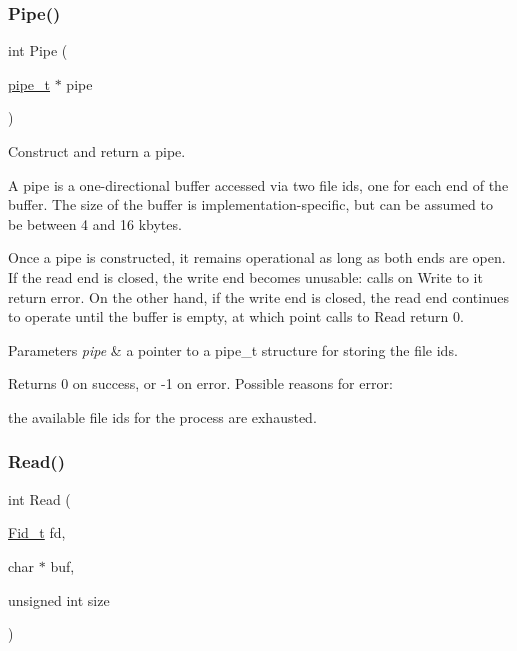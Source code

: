 \subsubsection{\texorpdfstring{Pipe()}{Pipe()}}
{\footnotesize\ttfamily int Pipe (\begin{DoxyParamCaption}\item[{\hyperlink{group__syscalls_gad56b5ceaaf7d3ab88b4be7f622314dfb}{pipe\+\_\+t} $\ast$}]{pipe }\end{DoxyParamCaption})}



Construct and return a pipe. 

A pipe is a one-\/directional buffer accessed via two file ids, one for each end of the buffer. The size of the buffer is implementation-\/specific, but can be assumed to be between 4 and 16 kbytes.

Once a pipe is constructed, it remains operational as long as both ends are open. If the read end is closed, the write end becomes unusable\+: calls on {\ttfamily Write} to it return error. On the other hand, if the write end is closed, the read end continues to operate until the buffer is empty, at which point calls to {\ttfamily Read} return 0.


\begin{DoxyParams}{Parameters}
{\em pipe} & a pointer to a pipe\+\_\+t structure for storing the file ids. \\
\hline
\end{DoxyParams}
\begin{DoxyReturn}{Returns}
0 on success, or -\/1 on error. Possible reasons for error\+:
\begin{DoxyItemize}
\item the available file ids for the process are exhausted. 
\end{DoxyItemize}
\end{DoxyReturn}
\mbox{\label{group__syscalls_ga3e9dc545a789eb45b2d356eabbac3ee3}} 
\subsubsection{\texorpdfstring{Read()}{Read()}}
{\footnotesize\ttfamily int Read (\begin{DoxyParamCaption}\item[{\hyperlink{group__syscalls_ga5097222c5f0da97d92d4712359abc38f}{Fid\+\_\+t}}]{fd,  }\item[{char $\ast$}]{buf,  }\item[{unsigned int}]{size }\end{DoxyParamCaption})}



